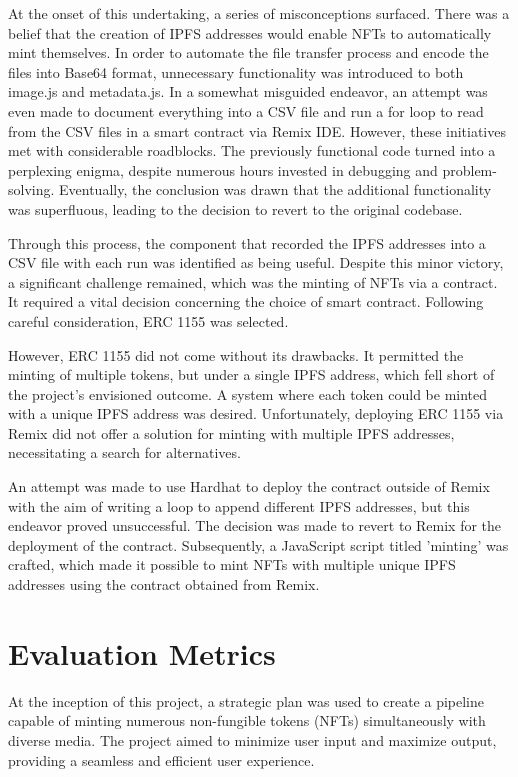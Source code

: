 \documentclass[10pt,twocolumn]{article}
\begin{document}
At the onset of this undertaking, a series of misconceptions surfaced. There was a belief that the creation of IPFS addresses would enable NFTs to automatically mint themselves. In order to automate the file transfer process and encode the files into Base64 format, unnecessary functionality was introduced to both image.js and metadata.js. In a somewhat misguided endeavor, an attempt was even made to document everything into a CSV file and run a for loop to read from the CSV files in a smart contract via Remix IDE. However, these initiatives met with considerable roadblocks. The previously functional code turned into a perplexing enigma, despite numerous hours invested in debugging and problem-solving. Eventually, the conclusion was drawn that the additional functionality was superfluous, leading to the decision to revert to the original codebase.

Through this process, the component that recorded the IPFS addresses into a CSV file with each run was identified as being useful. Despite this minor victory, a significant challenge remained, which was the minting of NFTs via a contract. It required a vital decision concerning the choice of smart contract. Following careful consideration, ERC 1155 was selected.

However, ERC 1155 did not come without its drawbacks. It permitted the minting of multiple tokens, but under a single IPFS address, which fell short of the project's envisioned outcome. A system where each token could be minted with a unique IPFS address was desired. Unfortunately, deploying ERC 1155 via Remix did not offer a solution for minting with multiple IPFS addresses, necessitating a search for alternatives.

An attempt was made to use Hardhat to deploy the contract outside of Remix with the aim of writing a loop to append different IPFS addresses, but this endeavor proved unsuccessful. The decision was made to revert to Remix for the deployment of the contract. Subsequently, a JavaScript script titled 'minting' was crafted, which made it possible to mint NFTs with multiple unique IPFS addresses using the contract obtained from Remix.
\section{Evaluation Metrics}

At the inception of this project, a strategic plan was used to create a pipeline capable of minting numerous non-fungible tokens (NFTs) simultaneously with diverse media. The project aimed to minimize user input and maximize output, providing a seamless and efficient user experience.
\end{document}
